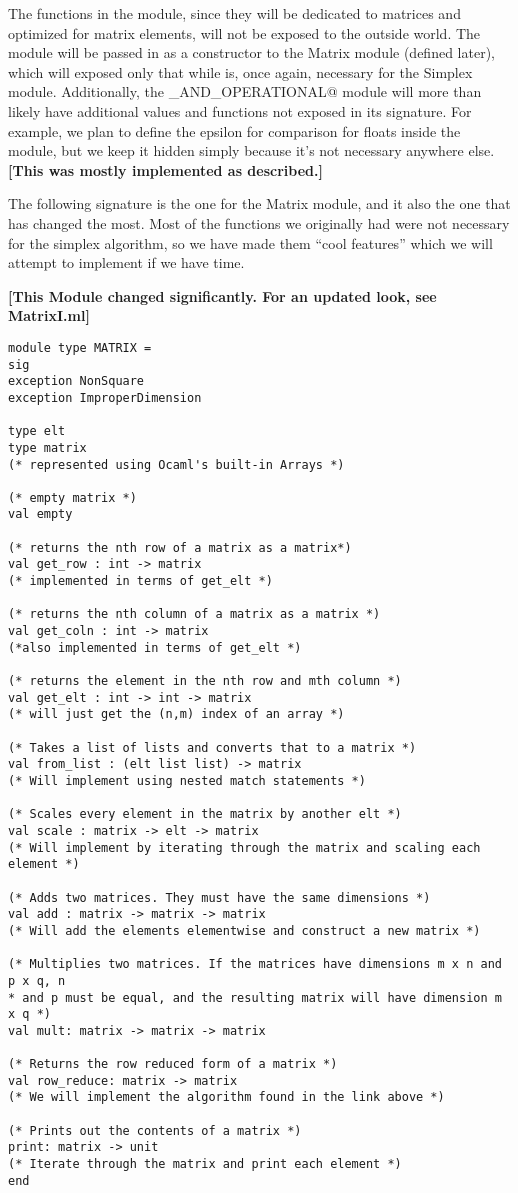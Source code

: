 \documentclass[letterpaper,11pt]{article}
\newcommand{\annot}[1]{\textbf{\color{BrickRed} [#1]}}
\begin{document}
The functions in the module, since they will be dedicated to matrices and
optimized for matrix elements, will not be exposed to the outside world. The
module will be passed in as a constructor to the Matrix module (defined later),
which will exposed only that while is, once again, necessary for the Simplex
module. Additionally, the \verb@ORDERED_AND_OPERATIONAL@ module will more than
likely have additional values and functions not exposed in its signature. For
example, we plan to define the epsilon for comparison for floats inside the
module, but we keep it hidden simply because it's not necessary anywhere else.
{\annot{This was mostly implemented as described.}}

The following signature is the one for the Matrix module, and it also the one
that has changed the most. Most of the functions we originally had were not
necessary for the simplex algorithm, so we have made them ``cool features''
which we will attempt to implement if we have time.

{\annot{This Module changed significantly. For an updated look, see MatrixI.ml}}
\begin{verbatim}
module type MATRIX =
sig
exception NonSquare
exception ImproperDimension

type elt
type matrix
(* represented using Ocaml's built-in Arrays *)

(* empty matrix *)
val empty

(* returns the nth row of a matrix as a matrix*)
val get_row : int -> matrix
(* implemented in terms of get_elt *)

(* returns the nth column of a matrix as a matrix *)
val get_coln : int -> matrix
(*also implemented in terms of get_elt *)

(* returns the element in the nth row and mth column *)
val get_elt : int -> int -> matrix 
(* will just get the (n,m) index of an array *)

(* Takes a list of lists and converts that to a matrix *)
val from_list : (elt list list) -> matrix
(* Will implement using nested match statements *)

(* Scales every element in the matrix by another elt *)
val scale : matrix -> elt -> matrix
(* Will implement by iterating through the matrix and scaling each element *)

(* Adds two matrices. They must have the same dimensions *)
val add : matrix -> matrix -> matrix
(* Will add the elements elementwise and construct a new matrix *)

(* Multiplies two matrices. If the matrices have dimensions m x n and p x q, n
* and p must be equal, and the resulting matrix will have dimension m x q *)
val mult: matrix -> matrix -> matrix

(* Returns the row reduced form of a matrix *)
val row_reduce: matrix -> matrix
(* We will implement the algorithm found in the link above *)

(* Prints out the contents of a matrix *)
print: matrix -> unit
(* Iterate through the matrix and print each element *)
end
\end{verbatim}
\end{document}
